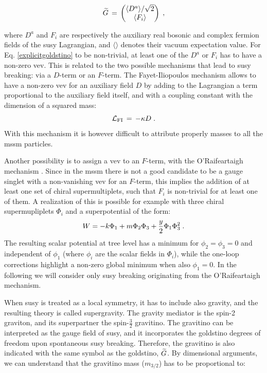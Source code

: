 \begin{equation}
 \widetilde{G} \,=\, 
 \begin{pmatrix}
\langle D^a \rangle /\sqrt{2} \cr \langle F_i\rangle 
\end{pmatrix} \; ,
\label{explicitgoldstino}
\end{equation} 

\noindent where $D^a$ and $F_i$ are respectively the auxiliary real bosonic and complex fermion fields of the \gls{susy} Lagrangian, and $\langle \rangle $ denotes their vacuum expectation value. For Eq. \ref{explicitgoldstino} to be non-trivial, at least one of the $D^a$ or $F_i$ has to have a non-zero \gls{vev}. This is related to the two possible mechanisms that lead to \gls{susy} breaking: via a $D$-term or an $F$-term. 
The Fayet-Iliopoulos mechanism \cite{Fayet:1974jb} allows to have a non-zero \gls{vev} for an auxiliary field $D$ by adding to the Lagrangian a term proportional to the auxiliary field itself, and with a coupling constant with the dimension of a squared mass:
\begin{equation}
\mathcal{L}_{\rm FI} \,=\, -\kappa D \; .
\end{equation}
With this mechanism it is however difficult to attribute properly masses to all the \gls{mssm} particles.

Another possibility is to assign a \gls{vev} to an $F$-term, with the O’Raifeartaigh mechanism \cite{ORaifeartaigh:1975nky}. Since in the \gls{mssm} there is not a good candidate to be a gauge singlet with a non-vanishing \gls{vev} for an $F$-term, this implies the addition of at least one set of chiral supermultiplets, such that $F_i$ is non-trivial for at least one of them. A realization of this is possible for example with three chiral supermupliplets $\Phi_i$ and a superpotential of the form:
\begin{equation}
W = -k \Phi_1 + m \Phi_2 \Phi_3 + {y\over 2} \Phi_1 \Phi_3^2 \;.
\label{oraif}
\end{equation}
The resulting scalar potential at tree level has a minimum for $\phi_2=\phi_3=0$ and independent of $\phi_1$ (where $\phi_i$ are the scalar fields in $\Phi_i$), while the one-loop corrections highlight a non-zero global minimum when also $\phi_1=0$. In the following we will consider only \gls{susy} breaking originating from the O’Raifeartaigh mechanism.


When \gls{susy} is treated as a local symmetry, it has to include also gravity, and the resulting theory is called supergravity. The gravity mediator is the spin-2 graviton, and its superpartner the spin-$\frac{3}{2}$ gravitino. The gravitino can be interpreted as the gauge field of \gls{susy}, and it incorporates the goldstino degrees of freedom upon spontaneous \gls{susy} breaking. Therefore, the gravitino is also indicated with the same symbol as the goldstino, $\widetilde{G}$. By dimensional arguments, we can understand that the gravitino mass ($m_{3/2}$) has to be proportional to:

